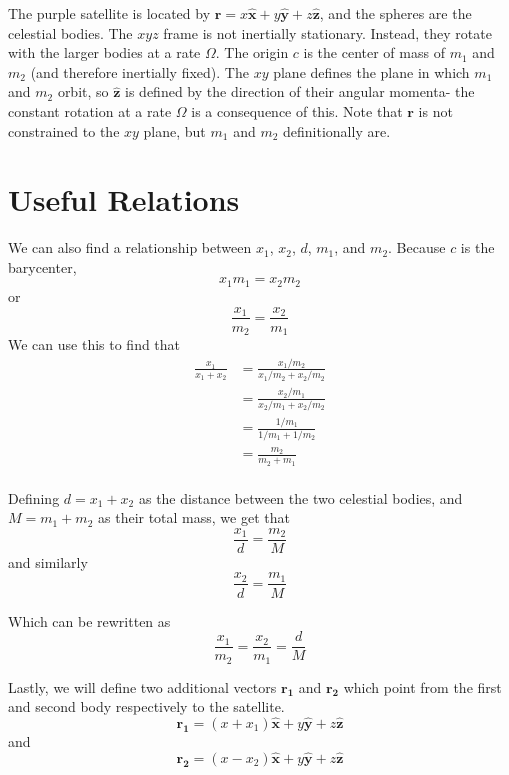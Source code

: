 \documentclass{article}
\newcommand{\vv}[1]{\boldsymbol{#1}}
\newcommand{\vh}[1]{\boldsymbol{\hat{#1}}}
\begin{document}
The purple satellite is located by $\vv{r}=x\vh{x}+y\vh{y}+z\vh{z}$, and the spheres are the celestial bodies. The $xyz$ frame is not inertially stationary. Instead, they rotate with the larger bodies at a rate $\Omega$. The origin $c$ is the center of mass of $m_1$ and $m_2$ (and therefore inertially fixed). The $xy$ plane defines the plane in which $m_1$ and $m_2$ orbit, so $\vh{z}$ is defined by the direction of their angular momenta- the constant rotation at a rate $\Omega$ is a consequence of this. Note that $\vv{r}$ is not constrained to the $xy$ plane, but $m_1$ and $m_2$ definitionally are. 

\section*{Useful Relations}

We can also find a relationship between $x_1$, $x_2$, $d$, $m_1$, and $m_2$. Because $c$ is the barycenter,
\[x_1m_1=x_2m_2\]
or
\[\frac{x_1}{m_2}=\frac{x_2}{m_1}\]
We can use this to find that
\[\begin{aligned}
\frac{x_1}{x_1+x_2}&=\frac{x_1/m_2}{x_1/m_2+x_2/m_2}\\
&=\frac{x_2/m_1}{x_2/m_1+x_2/m_2}\\
&=\frac{1/m_1}{1/m_1+1/m_2}\\
&=\frac{m_2}{m_2+m_1}\\
\end{aligned}\]

Defining $d=x_1+x_2$ as the distance between the two celestial bodies, and $M=m_1+m_2$ as their total mass, we get that
\[\boxed{\frac{x_1}{d}=\frac{m_2}{M}}\]
and similarly
\[\boxed{\frac{x_2}{d}=\frac{m_1}{M}}\]


Which can be rewritten as
\[\boxed{\frac{x_1}{m_2}=\frac{x_2}{m_1}=\frac{d}{M}}\]

Lastly, we will define two additional vectors $\vv{r_1}$ and $\vv{r_2}$ which point from the first and second body respectively to the satellite.
\[\vv{r_1}=\left(x+x_1\right)\vh{x}+y\vh{y}+z\vh{z}\]
and
\[\vv{r_2}=\left(x-x_2\right)\vh{x}+y\vh{y}+z\vh{z}\]
\end{document}
